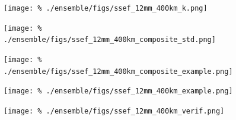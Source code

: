 \clearpage
\begin{figure}[cc]
    \centering
    \texttt{[image: \%
    ./ensemble/figs/ssef\_12mm\_400km\_k.png]}\\
    \caption{}
    \label{k-12mm-400km-dist}
\end{figure}


\clearpage
\begin{figure}[cc]
    \centering
    \texttt{[image: \%
    ./ensemble/figs/ssef\_12mm\_400km\_composite\_std.png]}\\
    \caption{}
    \label{ssef-12mm-400km-std}
\end{figure}


\clearpage
\begin{figure}[cc]
    \centering
    \texttt{[image: \%
    ./ensemble/figs/ssef\_12mm\_400km\_composite\_example.png]}\\
    \caption{}
    \label{ssef-12mm-400km-composite}
\end{figure}


\clearpage
\begin{figure}[cc]
    \centering
    \texttt{[image: \%
    ./ensemble/figs/ssef\_12mm\_400km\_example.png]}\\
    \caption{}
    \label{ssef-12mm-400km-example}
\end{figure}


\clearpage
\begin{figure}[cc]
    \centering
    \texttt{[image: \%
    ./ensemble/figs/ssef\_12mm\_400km\_verif.png]}\\
    \caption{}
    \label{ssef-12mm-400km-verif}
\end{figure}

